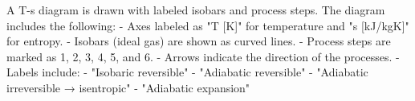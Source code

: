 A T-s diagram is drawn with labeled isobars and process steps. The diagram includes the following:  
- Axes labeled as "T [K]" for temperature and "s [kJ/kgK]" for entropy.  
- Isobars (ideal gas) are shown as curved lines.  
- Process steps are marked as 1, 2, 3, 4, 5, and 6.  
- Arrows indicate the direction of the processes.  
- Labels include:  
  - "Isobaric reversible"  
  - "Adiabatic reversible"  
  - "Adiabatic irreversible → isentropic"  
  - "Adiabatic expansion"